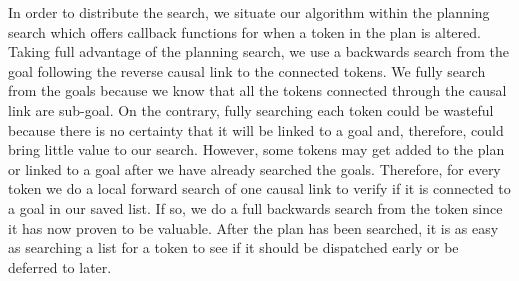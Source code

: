 In order to distribute the search, we situate our algorithm within the
planning search which offers callback functions for when a token in
the plan is altered. Taking full advantage of the planning search, we
use a backwards search from the goal following the reverse causal link
to the connected tokens.  We fully search from the goals because we
know that all the tokens connected through the causal link are
sub-goal.  On the contrary, fully searching each token could be
wasteful because there is no certainty that it will be linked to a
goal and, therefore, could bring little value to our search. However,
some tokens may get added to the plan or linked to a goal after we
have already searched the goals. Therefore, for every token we do a
local forward search of one causal link to verify if it is connected
to a goal in our saved list.  If so, we do a full backwards search
from the token since it has now proven to be valuable. After the plan
has been searched, it is as easy as searching a list for a token to
see if it should be dispatched early or be deferred to later.




